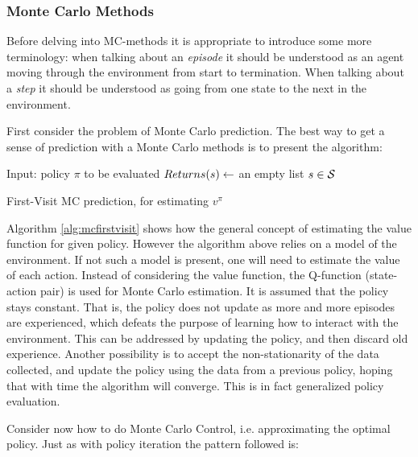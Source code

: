 \subsubsection{Monte Carlo Methods}

Before delving into MC-methods it is appropriate to introduce some more terminology: when talking about an \textit{episode} it should be understood as an agent moving through the environment from start to termination. When talking about a \textit{step} it should be understood as going from one state to the next in the environment. 

First consider the problem of Monte Carlo prediction. The best way to get a sense of prediction with a Monte Carlo methods is to present the algorithm:

\begin{algorithm}[H]
\SetAlgoLined
{}
 Input: policy $\pi$ to be evaluated\;
 $Returns(s) \leftarrow$ an empty list $s \in \mathcal{S}$\; 
 \caption{First-Visit MC prediction, for estimating $v^{\pi}$}
 \label{alg:mcfirstvisit}
\end{algorithm}

Algorithm \ref{alg:mcfirstvisit} shows how the general concept of estimating the value function for given policy.  However the algorithm above relies on a model of the environment. If not such a model is present, one will need to estimate the value of each action. Instead of considering the value function, the Q-function (state-action pair) is used for Monte Carlo estimation. It is assumed that the policy stays constant. That is, the policy does not update as more and more episodes are experienced, which defeats the purpose of learning how to interact with the environment. This can be addressed by updating the policy, and then discard old experience. Another possibility is to accept the non-stationarity of the data collected, and update the policy using the data from a previous policy, hoping that with time the algorithm will converge. This is in fact generalized policy evaluation.

Consider now how to do Monte Carlo Control, i.e. approximating the optimal policy. Just as with policy iteration the pattern followed is:

